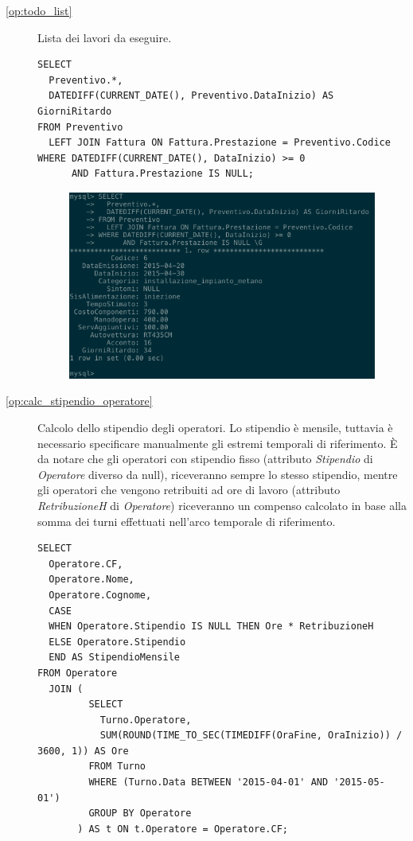 \begin{description}
            \item[\ref{op:todo_list}] Lista dei lavori da eseguire.

              \begin{lstlisting}
SELECT
  Preventivo.*,
  DATEDIFF(CURRENT_DATE(), Preventivo.DataInizio) AS GiorniRitardo
FROM Preventivo
  LEFT JOIN Fattura ON Fattura.Prestazione = Preventivo.Codice
WHERE DATEDIFF(CURRENT_DATE(), DataInizio) >= 0
      AND Fattura.Prestazione IS NULL;
              \end{lstlisting}

              \begin{figure}[H]
                \centering
                \includegraphics[width=12cm]{images/screenshots/todo_list.png}
              \end{figure}

            \item[\ref{op:calc_stipendio_operatore}] Calcolo dello stipendio degli operatori. Lo stipendio è mensile, tuttavia è necessario specificare manualmente gli estremi temporali di riferimento.
            È da notare che gli operatori con stipendio fisso (attributo \emph{Stipendio} di \emph{Operatore} diverso da null), riceveranno sempre lo stesso stipendio, mentre gli operatori che vengono retribuiti ad ore di lavoro (attributo \emph{RetribuzioneH} di \emph{Operatore}) riceveranno un compenso calcolato in base alla somma dei turni effettuati nell'arco temporale di riferimento.

              \begin{lstlisting}
SELECT
  Operatore.CF,
  Operatore.Nome,
  Operatore.Cognome,
  CASE
  WHEN Operatore.Stipendio IS NULL THEN Ore * RetribuzioneH
  ELSE Operatore.Stipendio
  END AS StipendioMensile
FROM Operatore
  JOIN (
         SELECT
           Turno.Operatore,
           SUM(ROUND(TIME_TO_SEC(TIMEDIFF(OraFine, OraInizio)) / 3600, 1)) AS Ore
         FROM Turno
         WHERE (Turno.Data BETWEEN '2015-04-01' AND '2015-05-01')
         GROUP BY Operatore
       ) AS t ON t.Operatore = Operatore.CF;
              \end{lstlisting}


\end{description}
